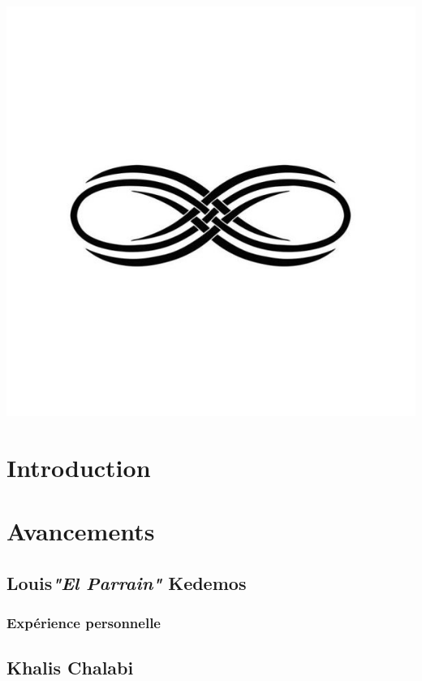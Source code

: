 \documentclass{article}
\begin{document}
\begin{center}
\includegraphics[scale=00.20]{infini}
\end{center}

\newpage
\thispagestyle{empty}
\tableofcontents

\newpage
\fontsize{12}{12}
\section{Introduction}

\newpage

\section{Avancements}
\subsection{Louis\textcolor{pseudoblue}{\textit{"El Parrain"}} Kedemos}

\subsubsection{Expérience personnelle}
\newpage

\subsection{Khalis Chalabi}
\end{document}
